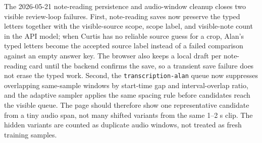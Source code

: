 \documentclass[12pt,letterpaper]{article}
\begin{document}
The 2026-05-21 note-reading persistence and audio-window cleanup closes two visible review-loop failures. First, note-reading saves now preserve the typed letters together with the visible-source scope, scope label, and visible-note count in the API model; when Curtis has no reliable source guess for a crop, Alan's typed letters become the accepted source label instead of a failed comparison against an empty answer key. The browser also keeps a local draft per note-reading card until the backend confirms the save, so a transient save failure does not erase the typed work. Second, the \texttt{transcription-alan} queue now suppresses overlapping same-sample windows by start-time gap and interval-overlap ratio, and the adaptive sampler applies the same spacing rule before candidates reach the visible queue. The page should therefore show one representative candidate from a tiny audio span, not many shifted variants from the same 1--2 s clip. The hidden variants are counted as duplicate audio windows, not treated as fresh training samples.
\end{document}
